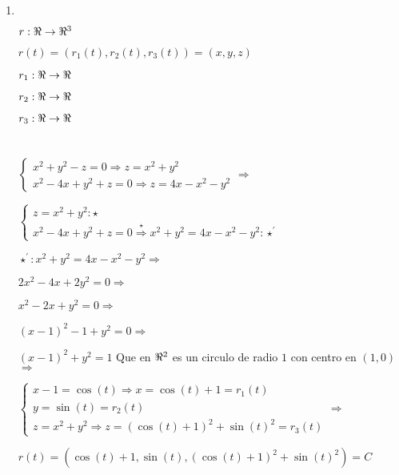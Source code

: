 \documentclass[../parcial.tex]{subfiles}
\begin{document}
    \begin{enumerate}
        \item 
            $ $

            $ r: \real \to \real^3 $

            $ r(t) = (r_1(t),r_2(t),r_3(t)) = (x,y,z)$

            $ r_1: \real \to \real $

            $ r_2: \real \to \real $

            $ r_3: \real \to \real $

            $ $

            $ $

            $\left\{
                \begin{array}{ll}
                    x^2 + y^2 - z = 0 \Rightarrow z = x^2 + y^2\\
                    x^2 - 4x + y^2 + z = 0 \Rightarrow z = 4x - x^2 - y^2
                \end{array}
            \right. \Rightarrow$

            $\left\{
                \begin{array}{ll}
                    z = x^2 + y^2 : \star\\
                    x^2 - 4x + y^2 + z = 0 \stackrel{\star}{\Rightarrow} x^2 + y^2 = 4x - x^2 - y^2 : \star^\prime
                \end{array}
            \right.$

            $\star^\prime: x^2 + y^2 = 4x - x^2 - y^2 \Rightarrow$

            $2x^2 - 4x + 2y^2 = 0 \Rightarrow$

            $x^2 - 2x + y^2 = 0 \Rightarrow$

            $(x-1)^2 - 1 + y^2 = 0 \Rightarrow$

            $(x-1)^2 + y^2 = 1 $ Que en $\real^2$ es un circulo de radio $1$ con centro en $(1,0)$ $\Rightarrow$

            $\left\{
                \begin{array}{ll}
                    x - 1 = \cos(t) \Rightarrow x = \cos(t) + 1 = r_1(t)\\
                    y = \sin(t) = r_2(t)\\
                    z = x^2 + y^2 \Rightarrow z = (\cos(t) + 1)^2 + \sin(t)^2 = r_3(t)
                \end{array}
            \right. \Rightarrow$

            $r(t) = (\cos(t)+1, \sin(t), (\cos(t)+1)^2 + \sin(t)^2) = C$


\end{enumerate}
\end{document}
